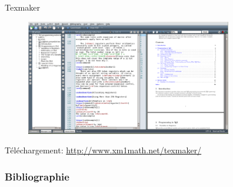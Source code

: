 \documentclass{beamer}
\begin{document}
\begin{frame}{Texmaker}

\begin{figure}
\centering
\includegraphics[width=9cm]{img/TexmakerView}
\end{figure}

{\footnotesize Téléchargement: \url{http://www.xm1math.net/texmaker/}}

\end{frame}











\begin{frame}
  \frametitle{Bibliographie}

\nocite{*}


\end{frame}


\end{document}
